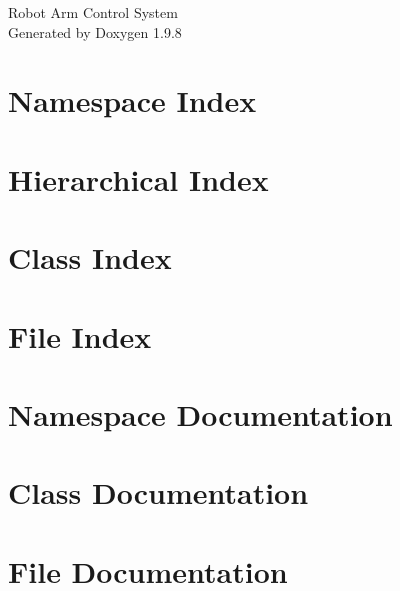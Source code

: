 \documentclass[twoside]{book}
\newcommand{\+}{\discretionary{\mbox{\scriptsize$\hookleftarrow$}}{}{}}
\newcommand{\clearemptydoublepage}{%
    \newpage{\pagestyle{empty}\cleardoublepage}%
  }
\begin{document}
  \raggedbottom
    \hypersetup{pageanchor=false,
                bookmarksnumbered=true,
                pdfencoding=unicode
               }
  \begin{titlepage}
  \vspace*{7cm}
  \begin{center}%
  {\Large Robot Arm Control System}\\
  \vspace*{1cm}
  {\large Generated by Doxygen 1.9.8}\\
  \end{center}
  \end{titlepage}
  \clearemptydoublepage
  \tableofcontents
  \clearemptydoublepage
  \hypersetup{pageanchor=true}

\chapter{Namespace Index}

\chapter{Hierarchical Index}

\chapter{Class Index}

\chapter{File Index}

\chapter{Namespace Documentation}

\chapter{Class Documentation}










\chapter{File Documentation}










  \backmatter
  \newpage
  \clearemptydoublepage
  \printindex
\end{document}
